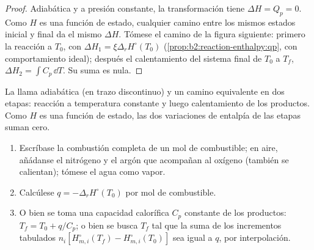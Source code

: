 \begin{proof}
Adiabática y a presión constante, la transformación tiene $\Delta H =
Q_p = 0$. Como $H$ es una función de estado, cualquier camino entre los mismos estados
inicial y final da el mismo $\Delta H$. Tómese el camino de
la figura siguiente: primero la reacción a $T_0$, con
$\Delta H_1 = \xi\Delta_r H^\circ(T_0)$ (\cref{prop:b2:reaction-enthalpy:qp},
con comportamiento ideal); después el calentamiento del sistema final de $T_0$ a
$T_f$, $\Delta H_2 = \int C_p\,\dd T$. Su suma es nula.
\end{proof}

\begin{omfigure}

{\small La llama adiabática (en trazo discontinuo) y un camino equivalente en dos
etapas: reacción a temperatura constante y luego calentamiento de los productos.
Como $H$ es una función de estado, las dos variaciones de entalpía de las etapas suman
cero.}
\end{omfigure}

\begin{method}\label{met:b2:reaction-enthalpy:flame-temperature}
\begin{enumerate}
  \item Escríbase la combustión completa de un mol de combustible; en aire, añádanse
        el nitrógeno y el argón que acompañan al oxígeno (también se
        calientan); tómese el agua como vapor.
  \item Calcúlese $q = -\Delta_r H^\circ(T_0)$ por mol de combustible.
  \item O bien se toma una capacidad calorífica $C_p$ constante de los productos:
        $T_f = T_0 + q/C_p$; o bien se busca $T_f$ tal que la suma de los
        incrementos tabulados $n_i[H^\circ_{m,i}(T_f) - H^\circ_{m,i}(T_0)]$
        sea igual a $q$, por interpolación.
\end{enumerate}
\end{method}

